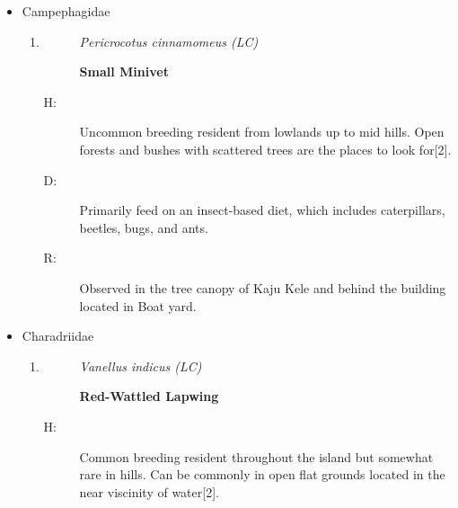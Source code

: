 \begin{itemize}
\begin{enumerate}
\begin{description}
\item[]%
\textit{Ixobrychus sinensis (EN)}%
\item[]%
\textbf{Yellow Bittern}%
\end{description}%
\begin{description}%
\item[H: ]%
Fairly Rare breeding resident in lowlands and a winter migrant to lowlands up to lower hills. reed beds and vegetation at wetland edges are the preferred habitat{[}2{]}.%
\item[D: ]%
Feed on a diet consisting of fish, insects, and various other invertebrates.%
\item[R: ]%
boat yard and the surrounding areas of Bolgoda lake.%
\end{description}%
\end{enumerate}%
\item%
Campephagidae%
\begin{enumerate}%
\item%
\begin{description}%
\item[]%
\textit{Pericrocotus cinnamomeus (LC)}%
\item[]%
\textbf{Small Minivet}%
\end{description}%
\begin{description}%
\item[H: ]%
Uncommon breeding resident from lowlands up to mid hills. Open forests and bushes with scattered trees are the places to look for{[}2{]}.%
\item[D: ]%
Primarily feed on an insect{-}based diet, which includes caterpillars, beetles, bugs, and ants.%
\item[R: ]%
Observed in the tree canopy of Kaju Kele and behind the building located in Boat yard.%
\end{description}%
\end{enumerate}%
\item%
Charadriidae%
\begin{enumerate}%
\item%
\begin{description}%
\item[]%
\textit{Vanellus indicus (LC)}%
\item[]%
\textbf{Red{-}Wattled Lapwing}%
\end{description}%
\begin{description}%
\item[H: ]%
Common breeding resident throughout the island but somewhat rare in hills. Can be commonly in open flat grounds located in the near viscinity of water{[}2{]}.%

\end{description}
\end{enumerate}
\end{itemize}

